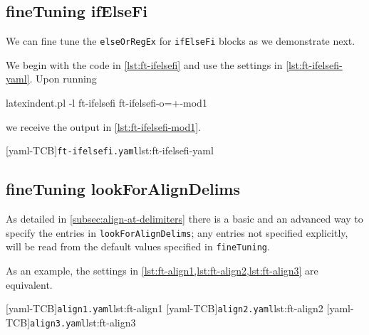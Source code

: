 \subsection{fineTuning ifElseFi}\label{subsec:finetuning:ifElseFi}
 We can fine tune the \texttt{elseOrRegEx} for \texttt{ifElseFi} blocks as we demonstrate next.

 \begin{example}
 We begin with the code in \cref{lst:ft-ifelsefi} and use the settings in
 \cref{lst:ft-ifelsefi-yaml}. Upon running

 \begin{commandshell}
latexindent.pl -l ft-ifelsefi ft-ifelsefi-o=+-mod1
\end{commandshell}

 we receive the output in \cref{lst:ft-ifelsefi-mod1}.

 \begin{cmhtcbraster}[raster columns=3,
   raster left skip=-3.5cm,
   raster right skip=-2cm,
   raster column skip=.03\linewidth]
  [yaml-TCB]{\texttt{ft-ifelsefi.yaml}}{lst:ft-ifelsefi-yaml}
 \end{cmhtcbraster}
 \end{example}

\subsection{fineTuning lookForAlignDelims}\label{subsec:finetuning:lookForAlignDelims}
 As detailed in \vref{subsec:align-at-delimiters} there is a basic and an advanced way to specify the entries
 in \texttt{lookForAlignDelims}; any entries not specified explicitly, will be read
 from the default values specified in \texttt{fineTuning}.

 As an example, the settings in \cref{lst:ft-align1,lst:ft-align2,lst:ft-align3} are
 equivalent.

 \begin{cmhtcbraster}[raster columns=3,
   raster left skip=-3.5cm,
   raster right skip=-2cm,
   raster column skip=.03\linewidth]
  [yaml-TCB]{\texttt{align1.yaml}}{lst:ft-align1}
  [yaml-TCB]{\texttt{align2.yaml}}{lst:ft-align2}
  [yaml-TCB]{\texttt{align3.yaml}}{lst:ft-align3}
 \end{cmhtcbraster}

